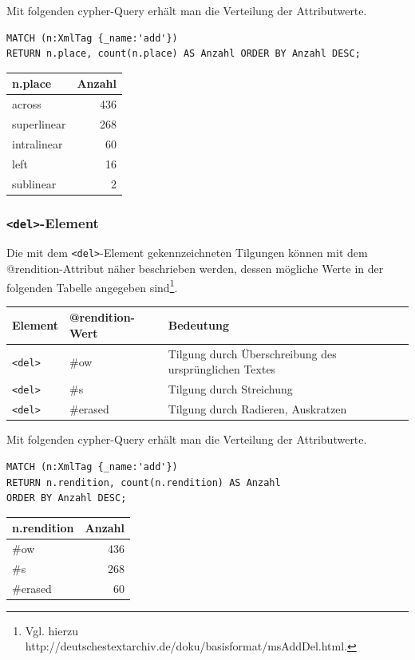 \documentclass[ngerman,]{scrreprt}
\begin{document}
Mit folgenden cypher-Query erhält man die Verteilung der Attributwerte.

\begin{verbatim}
MATCH (n:XmlTag {_name:'add'})
RETURN n.place, count(n.place) AS Anzahl ORDER BY Anzahl DESC;
\end{verbatim}

\begin{longtable}[]{@{}lr@{}}
\toprule
n.place & Anzahl\tabularnewline
\midrule
\endhead
across & 436\tabularnewline
superlinear & 268\tabularnewline
intralinear & 60\tabularnewline
left & 16\tabularnewline
sublinear & 2\tabularnewline
\bottomrule
\end{longtable}

\subsubsection{\texorpdfstring{\texttt{\textless{}del\textgreater{}}-Element}{\textless{}del\textgreater{}-Element}}\label{del-element}

Die mit dem \texttt{\textless{}del\textgreater{}}-Element gekennzeichneten Tilgungen können mit dem @rendition-Attribut näher beschrieben werden, dessen mögliche Werte in der folgenden Tabelle angegeben sind\footnote{Vgl. hierzu http://deutschestextarchiv.de/doku/basisformat/msAddDel.html.}.

\begin{longtable}[]{@{}lll@{}}
\toprule
Element & @rendition-Wert & Bedeutung\tabularnewline
\midrule
\endhead
\texttt{\textless{}del\textgreater{}} & \#ow & Tilgung durch Überschreibung des ursprünglichen Textes\tabularnewline
\texttt{\textless{}del\textgreater{}} & \#s & Tilgung durch Streichung\tabularnewline
\texttt{\textless{}del\textgreater{}} & \#erased & Tilgung durch Radieren, Auskratzen\tabularnewline
\bottomrule
\end{longtable}

Mit folgenden cypher-Query erhält man die Verteilung der Attributwerte.

\begin{verbatim}
MATCH (n:XmlTag {_name:'add'})
RETURN n.rendition, count(n.rendition) AS Anzahl
ORDER BY Anzahl DESC;
\end{verbatim}

\begin{longtable}[]{@{}lr@{}}
\toprule
n.rendition & Anzahl\tabularnewline
\midrule
\endhead
\#ow & 436\tabularnewline
\#s & 268\tabularnewline
\#erased & 60\tabularnewline
\bottomrule
\end{longtable}
\end{document}
